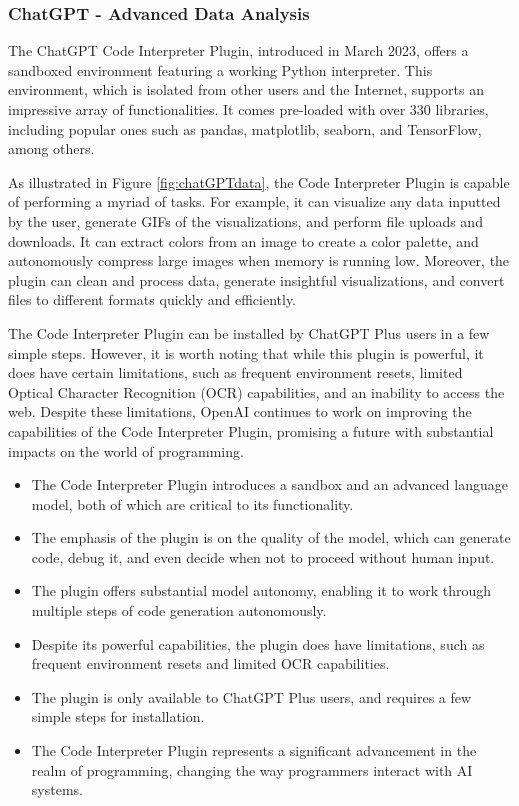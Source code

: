\subsubsection{ChatGPT - Advanced Data Analysis}
The ChatGPT Code Interpreter Plugin, introduced in March 2023, offers a sandboxed environment featuring a working Python interpreter. This environment, which is isolated from other users and the Internet, supports an impressive array of functionalities. It comes pre-loaded with over 330 libraries, including popular ones such as pandas, matplotlib, seaborn, and TensorFlow, among others.

As illustrated in Figure \ref{fig:chatGPTdata}, the Code Interpreter Plugin is capable of performing a myriad of tasks. For example, it can visualize any data inputted by the user, generate GIFs of the visualizations, and perform file uploads and downloads. It can extract colors from an image to create a color palette, and autonomously compress large images when memory is running low. Moreover, the plugin can clean and process data, generate insightful visualizations, and convert files to different formats quickly and efficiently.

The Code Interpreter Plugin can be installed by ChatGPT Plus users in a few simple steps. However, it is worth noting that while this plugin is powerful, it does have certain limitations, such as frequent environment resets, limited Optical Character Recognition (OCR) capabilities, and an inability to access the web. Despite these limitations, OpenAI continues to work on improving the capabilities of the Code Interpreter Plugin, promising a future with substantial impacts on the world of programming.

\begin{itemize}
\item The Code Interpreter Plugin introduces a sandbox and an advanced language model, both of which are critical to its functionality.
\item The emphasis of the plugin is on the quality of the model, which can generate code, debug it, and even decide when not to proceed without human input.
\item The plugin offers substantial model autonomy, enabling it to work through multiple steps of code generation autonomously.
\item Despite its powerful capabilities, the plugin does have limitations, such as frequent environment resets and limited OCR capabilities.
\item The plugin is only available to ChatGPT Plus users, and requires a few simple steps for installation.
\item The Code Interpreter Plugin represents a significant advancement in the realm of programming, changing the way programmers interact with AI systems.
\end{itemize}

